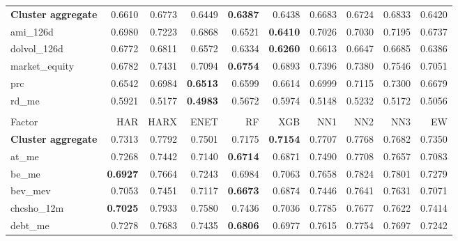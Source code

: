 \begin{longtable}{>{\raggedright\arraybackslash}p{2.6cm}rrrrrrrrr}
\hline
\textbf{Cluster aggregate} & 0.6610 & 0.6773 & \cellcolor{blue!10}0.6449 & \textbf{\cellcolor{blue!10}0.6387} & \cellcolor{blue!10}0.6438 & 0.6683 & 0.6724 & 0.6833 & \cellcolor{blue!10}0.6420 \\
ami\_126d & 0.6980 & 0.7223 & \cellcolor{blue!10}0.6868 & \cellcolor{blue!10}0.6521 & \textbf{\cellcolor{blue!10}0.6410} & 0.7026 & 0.7030 & 0.7195 & \cellcolor{blue!10}0.6737 \\
dolvol\_126d & 0.6772 & 0.6811 & \cellcolor{blue!10}0.6572 & \cellcolor{blue!10}0.6334 & \textbf{\cellcolor{blue!10}0.6260} & \cellcolor{blue!10}0.6613 & \cellcolor{blue!10}0.6647 & \cellcolor{blue!10}0.6685 & \cellcolor{blue!10}0.6386 \\
market\_equity & 0.6782 & 0.7431 & 0.7094 & \textbf{\cellcolor{blue!10}0.6754} & 0.6893 & 0.7396 & 0.7380 & 0.7546 & 0.7051 \\
prc & 0.6542 & 0.6984 & \textbf{\cellcolor{blue!10}0.6513} & 0.6599 & 0.6614 & 0.6999 & 0.7115 & 0.7300 & 0.6679 \\
rd\_me & 0.5921 & \cellcolor{blue!10}0.5177 & \textbf{\cellcolor{blue!10}0.4983} & \cellcolor{blue!10}0.5672 & 0.5974 & \cellcolor{blue!10}0.5148 & \cellcolor{blue!10}0.5232 & \cellcolor{blue!10}0.5172 & \cellcolor{blue!10}0.5056 \\
\hline
\multicolumn{10}{@{}l}{\textit{Panel M. Value}} \\
\hline
Factor & HAR & HARX & ENET & RF & XGB & NN1 & NN2 & NN3 & EW \\
\hline
\textbf{Cluster aggregate} & 0.7313 & 0.7792 & 0.7501 & \cellcolor{blue!10}0.7175 & \textbf{\cellcolor{blue!10}0.7154} & 0.7707 & 0.7768 & 0.7682 & 0.7350 \\
at\_me & 0.7268 & 0.7442 & \cellcolor{blue!10}0.7140 & \textbf{\cellcolor{blue!10}0.6714} & \cellcolor{blue!10}0.6871 & 0.7490 & 0.7708 & 0.7657 & \cellcolor{blue!10}0.7083 \\
be\_me & \textbf{0.6927} & 0.7664 & 0.7243 & 0.6984 & 0.7063 & 0.7658 & 0.7824 & 0.7801 & 0.7279 \\
bev\_mev & 0.7053 & 0.7451 & 0.7117 & \textbf{\cellcolor{blue!10}0.6673} & \cellcolor{blue!10}0.6874 & 0.7446 & 0.7641 & 0.7631 & 0.7071 \\
chcsho\_12m & \textbf{0.7025} & 0.7933 & 0.7580 & 0.7436 & 0.7036 & 0.7785 & 0.7677 & 0.7622 & 0.7414 \\
debt\_me & 0.7278 & 0.7683 & 0.7435 & \textbf{\cellcolor{blue!10}0.6806} & \cellcolor{blue!10}0.6977 & 0.7615 & 0.7754 & 0.7697 & \cellcolor{blue!10}0.7242 \\

\end{longtable}

